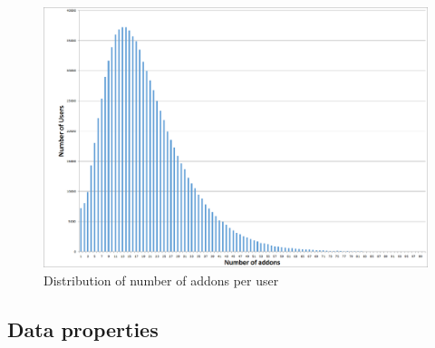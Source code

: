 \documentclass[ijoc,nonblindrev]{informs3} %
\numberwithin{equation}{subsection}
\begin{document}

\begin{figure}[!htbp]
\centering
\includegraphics[width=\linewidth]{figures/user_addons_histogram.png}
\caption{Distribution of number of addons per user}
\label{fig:user_addons_histogram}
\end{figure}

\subsection{Data properties}
\end{document}
